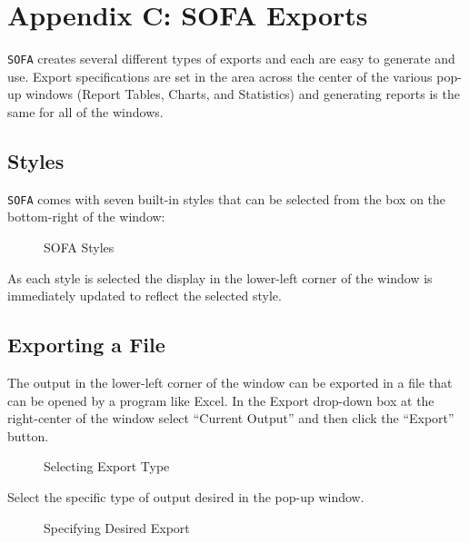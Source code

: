 \section{Appendix C: SOFA Exports} \label{app:c}

\texttt{SOFA} creates several different types of exports and each are easy to generate and use. Export specifications are set in the area across the center of the various pop-up windows (Report Tables, Charts, and Statistics) and generating reports is the same for all of the windows.

\subsection{Styles}

\texttt{SOFA} comes with seven built-in styles that can be selected from the box on the bottom-right of the window:

\begin{figure}[H]
  \begin{center}
    \caption{SOFA Styles}
  \end{center}
\end{figure}

As each style is selected the display in the lower-left corner of the window is immediately updated to reflect the selected style.

\subsection{Exporting a File}

The output in the lower-left corner of the window can be exported in a file that can be opened by a program like Excel. In the Export drop-down box at the right-center of the window select ``Current Output'' and then click the ``Export'' button.

\begin{figure}[H]
  \begin{center}
    \caption{Selecting Export Type}
  \end{center}
\end{figure}

Select the specific type of output desired in the pop-up window.

\begin{figure}[H]
  \begin{center}
    \caption{Specifying Desired Export}
  \end{center}
\end{figure}

